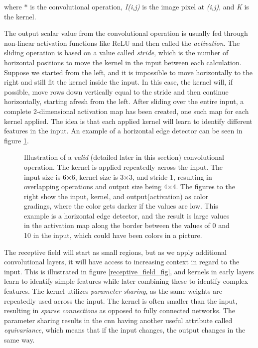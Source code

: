      where $*$ is the convolutional operation, \textit{I(i,j)} is the image pixel at \textit{(i,j)}, and \textit{K} is the kernel.
     
    The output scalar value from the convolutional operation is usually fed through non-linear activation functions like ReLU and then called the \textit{activation}. The sliding operation is based on a value called \textit{stride}, which is the number of horizontal positions to move the kernel in the input between each calculation. Suppose we started from the left, and it is impossible to move horizontally to the right and still fit the kernel inside the input. In this case, the kernel will, if possible, move rows down vertically equal to the stride and then continue horizontally, starting afresh from the left. After sliding over the entire input, a complete 2-dimensional activation map has been created, one such map for each kernel applied. The idea is that each applied kernel will learn to identify different features in the input. An example of a horizontal edge detector can be seen in figure \ref{convolutional_fig}\cite{o2015introduction_convolutions}. 
    \begin{figure}[H]
        \centering
                
        \caption[Horizontal edge detector example]{Illustration of a \textit{valid} (detailed later in this section) convolutional operation. The kernel is applied repeatedly across the input. The input size is 6×6, kernel size is 3×3, and stride 1, resulting in overlapping operations and output size being 4×4. The figures to the right show the input, kernel, and output(activation) as color gradings, where the color gets darker if the values are low. This example is a horizontal edge detector, and the result is large values in the activation map along the border between the values of 0 and 10 in the input, which could have been colors in a picture.}
      	\medskip 
        \label{convolutional_fig}
    \end{figure}
    
    The receptive field will start as small regions, but as we apply additional convolutional layers, it will have access to increasing context in regard to the input\cite{Goodfellow-et-al-2016}. This is illustrated in figure \ref{receptive_field_fig}, and kernels in early layers learn to identify simple features while later combining these to identify complex features. The kernel utilizes \textit{parameter sharing}, as the same weights are repeatedly used across the input. The kernel is often smaller than the input, resulting in \textit{sparse connections} as opposed to fully connected networks. The parameter sharing results in the \gls{cnn} having another useful attribute called \textit{equivariance}, which means that if the input changes, the output changes in the same way.
    
